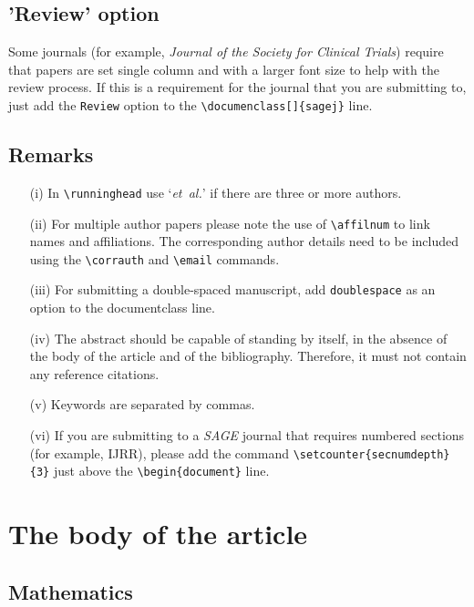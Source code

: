 \documentclass[Afour,sageh,times]{includes/tex/sagej}
\begin{document}
\subsection{'Review' option}

Some journals (for example,
\emph{Journal of the Society for Clinical Trials}) require that papers
are set single column and with a larger font size to help with the
review process. If this is a requirement for the journal that you are
submitting to, just add the \verb+Review+ option to the
\verb+\documenclass[]{sagej}+ line.

\subsection{Remarks}

\begin{enumerate}
  \item[(i)] In \verb"\runninghead" use `\textit{et~al.}' if there are three 
  or more authors.
  \item[(ii)] For multiple author papers please note the use of 
  \verb"\affilnum" to link names and affiliations. The corresponding author 
  details need to be included using the \verb+\corrauth+ and 
  \verb+\email+ commands.
  \item[(iii)] For submitting a double-spaced manuscript, add 
  \verb"doublespace" as an option to the documentclass line.
  \item[(iv)] The abstract should be capable of standing by itself, in the 
  absence of the body of the article and of the bibliography. Therefore, it 
  must not contain any reference citations.
  \item[(v)] Keywords are separated by commas.
  \item[(vi)] If you are submitting to a \textit{SAGE} journal that requires 
  numbered sections (for example, IJRR), please add the command 
  \verb+\setcounter{secnumdepth}{3}+ just above the \verb+\begin{document}+ 
  line.
\end{enumerate}

\section{The body of the article}

\subsection{Mathematics}
\end{document}
